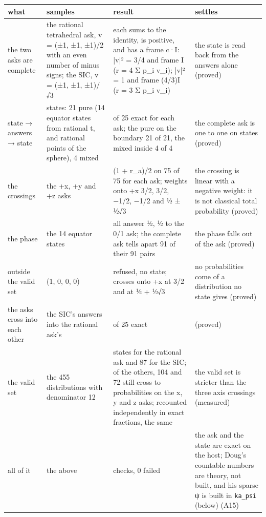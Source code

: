 {\footnotesize
\setlength{\tabcolsep}{6pt}
\begin{longtable}{>{\RaggedRight\arraybackslash}p{}>{\RaggedRight\arraybackslash}p{}>{\RaggedRight\arraybackslash}p{}>{\RaggedRight\arraybackslash}p{}}
\toprule
what & samples & result & settles \\
\midrule
\endhead
the two asks are complete & the rational tetrahedral ask, v = (±1, ±1, ±1)/2 with an even number of minus signs; the SIC, v = (±1, ±1, ±1)/√3 & each sums to the identity, is positive, and has a frame c·I: |v|² = 3/4 and frame I (r = 4 Σ p\_\allowbreak{}i v\_\allowbreak{}i); |v|² = 1 and frame (4/3)I (r = 3 Σ p\_\allowbreak{}i v\_\allowbreak{}i) & the state is read back from the answers alone (proved) \\
state → answers → state & 25 states: 21 pure (14 equator states from rational t, and rational points of the sphere), 4 mixed & 25 of 25 exact for each ask; the pure on the boundary 21 of 21, the mixed inside 4 of 4 & the complete ask is one to one on states (proved) \\
the crossings & the +x, +y and +z asks & (1 + r\_\allowbreak{}a)/2 on 75 of 75 for each ask; weights onto +x 3/2, 3/2, −1/2, −1/2 and ½ ± ½√3 & the crossing is linear with a negative weight: it is not classical total probability (proved) \\
the phase & the 14 equator states & all answer ½, ½ to the 0/1 ask; the complete ask tells apart 91 of their 91 pairs & the phase falls out of the ask (proved) \\
outside the valid set & (1, 0, 0, 0) & refused, no state; crosses onto +x at 3/2 and at ½ + ½√3 & no probabilities come of a distribution no state gives (proved) \\
the asks cross into each other & the SIC's answers into the rational ask's & 25 of 25 exact & (proved) \\
the valid set & the 455 distributions with denominator 12 & 55 states for the rational ask and 87 for the SIC; of the others, 104 and 72 still cross to probabilities on the x, y and z asks; recounted independently in exact fractions, the same & the valid set is stricter than the three axis crossings (measured) \\
all of it & the above & 33 checks, 0 failed & the ask and the state are exact on the host; Doug's countable numbers are theory, not built, and his sparse ψ is built in \texttt{ka\_\allowbreak{}psi} (below) (A15) \\
\bottomrule
\end{longtable}
}

